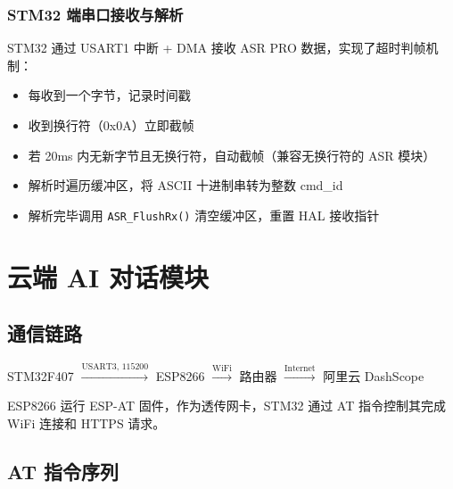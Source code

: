 \documentclass[12pt,a4paper]{ctexart}
\begin{document}
\subsubsection{STM32 端串口接收与解析}

STM32 通过 USART1 中断 + DMA 接收 ASR PRO 数据，实现了超时判帧机制：

\begin{itemize}
    \item 每收到一个字节，记录时间戳
    \item 收到换行符（0x0A）立即截帧
    \item 若 20ms 内无新字节且无换行符，自动截帧（兼容无换行符的 ASR 模块）
    \item 解析时遍历缓冲区，将 ASCII 十进制串转为整数 cmd\_id
    \item 解析完毕调用 \texttt{ASR\_FlushRx()} 清空缓冲区，重置 HAL 接收指针
\end{itemize}

\section{云端 AI 对话模块}

\subsection{通信链路}

\begin{center}
STM32F407 $\xrightarrow{\text{USART3, 115200}}$ ESP8266 $\xrightarrow{\text{WiFi}}$ 路由器 $\xrightarrow{\text{Internet}}$ 阿里云 DashScope
\end{center}

ESP8266 运行 ESP-AT 固件，作为透传网卡，STM32 通过 AT 指令控制其完成 WiFi 连接和 HTTPS 请求。

\subsection{AT 指令序列}
\end{document}
